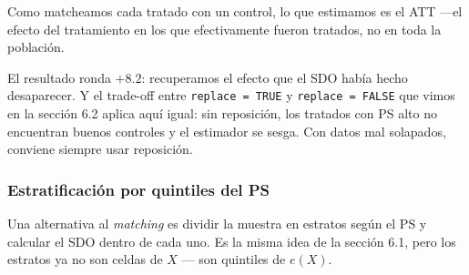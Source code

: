 \documentclass[
  letterpaper,
  DIV=11,
  numbers=noendperiod,
  oneside]{scrreprt}
\newenvironment{Shaded}{\begin{snugshade}}{\end{snugshade}}
\newcommand{\AttributeTok}[1]{\textcolor[rgb]{0.40,0.45,0.13}{#1}}
\newcommand{\CommentTok}[1]{\textcolor[rgb]{0.37,0.37,0.37}{#1}}
\newcommand{\DecValTok}[1]{\textcolor[rgb]{0.68,0.00,0.00}{#1}}
\newcommand{\FunctionTok}[1]{\textcolor[rgb]{0.28,0.35,0.67}{#1}}
\newcommand{\NormalTok}[1]{\textcolor[rgb]{0.00,0.23,0.31}{#1}}
\newcommand{\OtherTok}[1]{\textcolor[rgb]{0.00,0.23,0.31}{#1}}
\newcommand{\SpecialCharTok}[1]{\textcolor[rgb]{0.37,0.37,0.37}{#1}}
\newcommand{\StringTok}[1]{\textcolor[rgb]{0.13,0.47,0.30}{#1}}
\begin{document}
Como matcheamos cada tratado con un control, lo que estimamos es el ATT
---el efecto del tratamiento en los que efectivamente fueron tratados,
no en toda la población.

El resultado ronda \(+8.2\): recuperamos el efecto que el SDO había
hecho desaparecer. Y el trade-off entre \texttt{replace\ =\ TRUE} y
\texttt{replace\ =\ FALSE} que vimos en la sección 6.2 aplica aquí
igual: sin reposición, los tratados con PS alto no encuentran buenos
controles y el estimador se sesga. Con datos mal solapados, conviene
siempre usar reposición.

\hypertarget{estratificaciuxf3n-por-quintiles-del-ps}{%
\subsubsection{Estratificación por quintiles del
PS}\label{estratificaciuxf3n-por-quintiles-del-ps}}

Una alternativa al \emph{matching} es dividir la muestra en estratos
según el PS y calcular el SDO dentro de cada uno. Es la misma idea de la
sección 6.1, pero los estratos ya no son celdas de \(X\) --- son
quintiles de \(e(X)\).

\begin{Shaded}
\end{Shaded}
\end{document}
